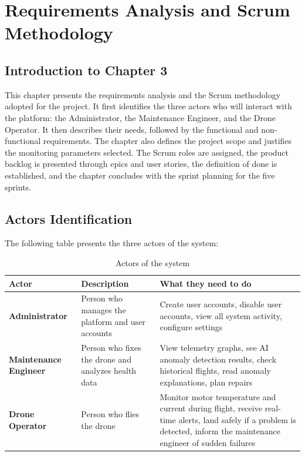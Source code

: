 \chapter{Requirements Analysis and Scrum Methodology}

\section*{Introduction to Chapter 3}

This chapter presents the requirements analysis and the Scrum methodology adopted for the project. It first identifies the three actors who will interact with the platform: the Administrator, the Maintenance Engineer, and the Drone Operator. It then describes their needs, followed by the functional and non-functional requirements. The chapter also defines the project scope and justifies the monitoring parameters selected. The Scrum roles are assigned, the product backlog is presented through epics and user stories, the definition of done is established, and the chapter concludes with the sprint planning for the five sprints.

\section{Actors Identification}

The following table presents the three actors of the system:

\begin{table}[H]
\centering
\caption{Actors of the system}
\begin{tabular}{|p{3cm}|p{4cm}|p{6cm}|}
\hline
\textbf{Actor} & \textbf{Description} & \textbf{What they need to do} \\
\hline
\textbf{Administrator} & Person who manages the platform and user accounts & Create user accounts, disable user accounts, view all system activity, configure settings \\
\hline
\textbf{Maintenance Engineer} & Person who fixes the drone and analyzes health data & View telemetry graphs, see AI anomaly detection results, check historical flights, read anomaly explanations, plan repairs \\
\hline
\textbf{Drone Operator} & Person who flies the drone & Monitor motor temperature and current during flight, receive real-time alerts, land safely if a problem is detected, inform the maintenance engineer of sudden failures \\
\hline
\end{tabular}
\end{table}

